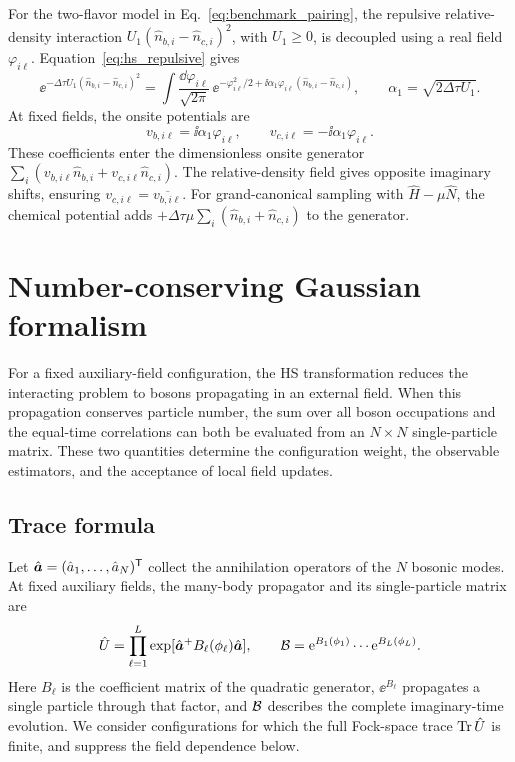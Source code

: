 For the two-flavor model in Eq.~\eqref{eq:benchmark_pairing}, the repulsive relative-density interaction $U_1(\hat n_{b,i}-\hat n_{c,i})^2$, with $U_1\ge0$, is decoupled using a real field $\varphi_{i\ell}$. Equation~\eqref{eq:hs_repulsive} gives
\begin{equation}
    \ee^{-\Delta\tau U_1(\hat n_{b,i}-\hat n_{c,i})^2}
    =
    \int \frac{\dd\varphi_{i\ell}}{\sqrt{2\pi}}\,
    \ee^{-\varphi_{i\ell}^2/2+\ii\alpha_1\varphi_{i\ell}(\hat n_{b,i}-\hat n_{c,i})},
    \qquad
    \alpha_1=\sqrt{2\Delta\tau U_1}.
\label{eq:benchmark_hs_relative}
\end{equation}
At fixed fields, the onsite potentials are
\begin{equation}
    v_{b,i\ell}=\ii\alpha_1\varphi_{i\ell},\qquad
    v_{c,i\ell}=-\ii\alpha_1\varphi_{i\ell}.
    \label{eq:benchmark_hs_potentials}
\end{equation}
These coefficients enter the dimensionless onsite generator $\sum_i(v_{b,i\ell}\hat n_{b,i}+v_{c,i\ell}\hat n_{c,i})$. The relative-density field gives opposite imaginary shifts, ensuring $v_{c,i\ell}=\overline{v_{b,i\ell}}$. For grand-canonical sampling with $\hat H-\mu\hat N$, the chemical potential adds $+\Delta\tau\mu\sum_i(\hat n_{b,i}+\hat n_{c,i})$ to the generator.

\section{Number-conserving Gaussian formalism}
\label{app:number_conserving_gaussian}

For a fixed auxiliary-field configuration, the HS transformation reduces the interacting problem to bosons propagating in an external field. When this propagation conserves particle number, the sum over all boson occupations and the equal-time correlations can both be evaluated from an $N\times N$ single-particle matrix. These two quantities determine the configuration weight, the observable estimators, and the acceptance of local field updates.

\subsection{Trace formula}
\label{app:trace_number}

Let $\hat{\bm{a}}=(\hat a_1,\ldots,\hat a_N)^{\mathsf{T}}$ collect the annihilation operators of the $N$ bosonic modes. At fixed auxiliary fields, the many-body propagator and its single-particle matrix are
\begin{equation}
    \hat U=\prod_{\ell=1}^{L}\exp[\hat{\bm{a}}^+B_\ell(\phi_\ell)\hat{\bm{a}}],
    \qquad
    \mathcal{B}=\mathrm{e}^{B_1(\phi_1)}\cdots\mathrm{e}^{B_L(\phi_L)}.
\end{equation}
Here $B_\ell$ is the coefficient matrix of the quadratic generator, $\ee^{B_\ell}$ propagates a single particle through that factor, and $\mathcal{B}$ describes the complete imaginary-time evolution. We consider configurations for which the full Fock-space trace $\operatorname{Tr}\hat U$ is finite, and suppress the field dependence below.

